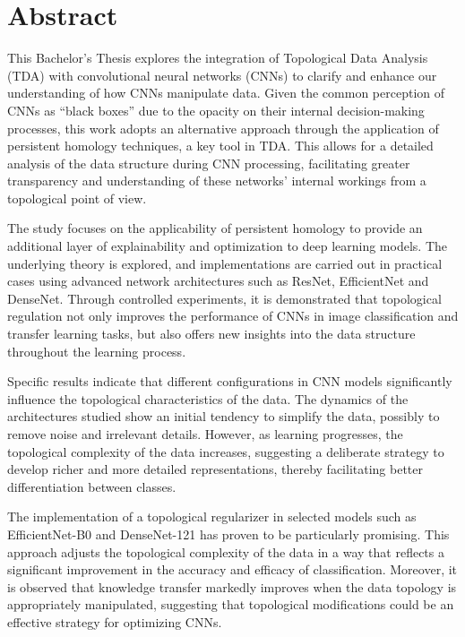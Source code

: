 %

\chapter{Abstract}

This Bachelor's Thesis explores the integration of Topological Data Analysis (TDA)
with convolutional neural networks (CNNs) to clarify and enhance our
understanding of how CNNs manipulate data. Given the common perception of CNNs as
\enquote{black boxes} due to the opacity on their internal decision-making
processes, this work adopts an alternative approach through the application of persistent
homology techniques, a key tool in TDA. This allows for a detailed analysis of the
data structure during CNN processing, facilitating greater transparency and
understanding of these networks' internal workings from a topological point of view.

The study focuses on the applicability of persistent homology to provide an additional
layer of explainability and optimization to deep learning models. The underlying
theory is explored, and implementations are carried out in practical cases using
advanced network architectures such as ResNet, EfficientNet and DenseNet. Through
controlled experiments, it is demonstrated that topological regulation not only
improves the performance of CNNs in image classification and transfer learning
tasks, but also offers new insights into the data structure throughout the learning
process.

Specific results indicate that different configurations in CNN models significantly
influence the topological characteristics of the data. The dynamics of the
architectures studied show an initial tendency to simplify the data, possibly to
remove noise and irrelevant details. However, as learning progresses, the
topological complexity of the data increases, suggesting a deliberate strategy to
develop richer and more detailed representations, thereby facilitating better
differentiation between classes.

The implementation of a topological regularizer in selected models such as
EfficientNet-B0 and DenseNet-121 has proven to be particularly promising. This approach
adjusts the topological complexity of the data in a way that reflects a significant
improvement in the accuracy and efficacy of classification. Moreover, it is observed
that knowledge transfer markedly improves when the data topology is appropriately
manipulated, suggesting that topological modifications could be an effective
strategy for optimizing CNNs.

